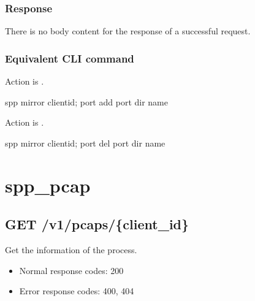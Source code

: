 \documentclass[a4paper,11pt,openany,oneside,english]{sphinxmanual}
\begin{document}
\subsubsection{Response}
\label{\detokenize{api_ref/spp_mirror:id12}}
There is no body content for the response of a successful  request.


\subsubsection{Equivalent CLI command}
\label{\detokenize{api_ref/spp_mirror:id13}}
Action is .

\begin{sphinxVerbatim}[commandchars=\\\{\},formatcom=\footnotesize]
spp \PYGZgt{} mirror \PYGZob{}client\PYGZus{}id\PYGZcb{}; port add \PYGZob{}port\PYGZcb{} \PYGZob{}dir\PYGZcb{} \PYGZob{}name\PYGZcb{}
\end{sphinxVerbatim}

Action is .

\begin{sphinxVerbatim}[commandchars=\\\{\},formatcom=\footnotesize]
spp \PYGZgt{} mirror \PYGZob{}client\PYGZus{}id\PYGZcb{}; port del \PYGZob{}port\PYGZcb{} \PYGZob{}dir\PYGZcb{} \PYGZob{}name\PYGZcb{}
\end{sphinxVerbatim}


\section{spp\_pcap}
\label{\detokenize{api_ref/spp_pcap:spp-pcap}}\label{\detokenize{api_ref/spp_pcap:spp-ctl-rest-api-spp-pcap}}\label{\detokenize{api_ref/spp_pcap::doc}}

\subsection{GET /v1/pcaps/\{client\_id\}}
\label{\detokenize{api_ref/spp_pcap:get-v1-pcaps-client-id}}
Get the information of the  process.
\begin{itemize}
\item {} 
Normal response codes: 200

\item {} 
Error response codes: 400, 404

\end{itemize}
\end{document}

